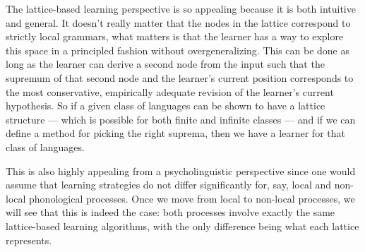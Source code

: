 The lattice-based learning perspective is so appealing because it is both intuitive and general.
It doesn't really matter that the nodes in the lattice correspond to strictly local grammars, what matters is that the learner has a way to explore this space in a principled fashion without overgeneralizing.
This can be done as long as the learner can derive a second node from the input such that the supremum of that second node and the learner's current position corresponds to the most conservative, empirically adequate revision of the learner's current hypothesis.
So if a given class of languages can be shown to have a lattice structure --- which is possible for both finite and infinite classes --- and if we can define a method for picking the right suprema, then we have a learner for that class of languages.

This is also highly appealing from a psycholinguistic perspective since one would assume that learning strategies do not differ significantly for, say, local and non-local phonological processes.
Once we move from local to non-local processes, we will see that this is indeed the case: both processes involve exactly the same lattice-based learning algorithms, with the only difference being what each lattice represents.
